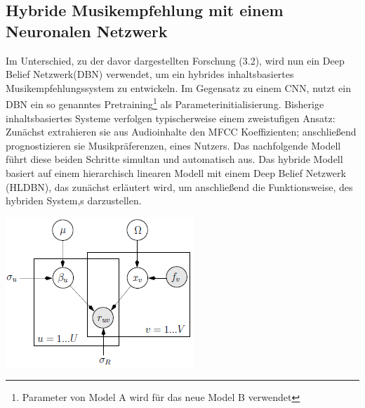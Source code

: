 \documentclass[twosided,a4,10pt]{article}
\begin{document}
\begin{multicols}{2}
		\subsection{Hybride Musikempfehlung mit einem Neuronalen Netzwerk}
		Im Unterschied, zu der davor dargestellten Forschung (3.2), wird nun ein Deep Belief Netzwerk(DBN) verwendet, um ein hybrides inhaltsbasiertes Musikempfehlungssystem zu entwickeln. Im Gegensatz zu einem CNN, nutzt ein DBN ein so genanntes Pretraining\footnote[15]{Parameter von Model A wird für das neue Model B verwendet} als Parameterinitialisierung. Bisherige inhaltsbasiertes Systeme verfolgen typischerweise einem zweistufigen Ansatz: Zunächst extrahieren sie aus Audioinhalte den MFCC Koeffizienten; anschließend prognostizieren sie Musikpräferenzen, eines Nutzers. Das nachfolgende Modell führt diese beiden Schritte simultan und automatisch aus. \cite{wang}\newline
		Das hybride Modell basiert auf einem hierarchisch linearen Modell mit einem Deep Belief Netzwerk (HLDBN), das zunächst erläutert wird, um anschließend die Funktionsweise, des hybriden System,s darzustellen.
		\begin{minipage}{0.45\textwidth}
			\centering
			\includegraphics{img/hlmdbn.png}
			\label{img:hlmdbn}
		\end{minipage}

\end{multicols}
\end{document}
